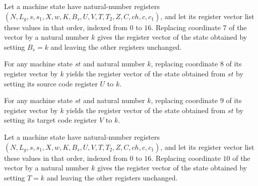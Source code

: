 \begin{lemma}
\label{Complexity.LogProg.ExpBFS.St.upd_Bs}
\leanok
{}
Let a machine state have natural-number registers
$(N,L_g,s,s_1,X,w,K,B_s,U,V,T,T_2,Z,C,ch,c,c_1)$, and let its register vector list these
values in that order, indexed from $0$ to $16$. Replacing coordinate $7$ of the vector
by a natural number $k$ gives the register vector of the state obtained by setting
$B_s=k$ and leaving the other registers unchanged.
\end{lemma}

\begin{lemma}
\label{Complexity.LogProg.ExpBFS.St.upd_U}
\leanok
{}
For any machine state $st$ and natural number $k$, replacing coordinate $8$ of its
register vector by $k$ yields the register vector of the state obtained from $st$ by
setting its source code register $U$ to $k$.
\end{lemma}

\begin{lemma}
\label{Complexity.LogProg.ExpBFS.St.upd_V}
\leanok
{}
For any machine state $st$ and natural number $k$, replacing coordinate $9$ of its
register vector by $k$ yields the register vector of the state obtained from $st$ by
setting its target code register $V$ to $k$.
\end{lemma}

\begin{lemma}
\label{Complexity.LogProg.ExpBFS.St.upd_T}
\leanok
{}
Let a machine state have natural-number registers
$(N,L_g,s,s_1,X,w,K,B_s,U,V,T,T_2,Z,C,ch,c,c_1)$, and let its register vector list these
values in that order, indexed from $0$ to $16$. Replacing coordinate $10$ of the vector
by a natural number $k$ gives the register vector of the state obtained by setting $T=k$
and leaving the other registers unchanged.
\end{lemma}

